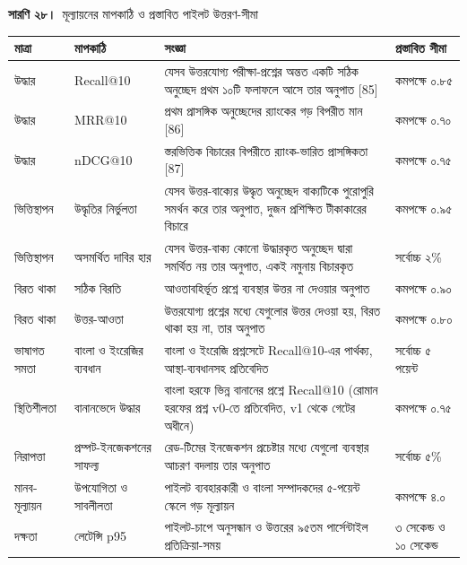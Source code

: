 \documentclass[border=10pt]{standalone}
\begin{document}
\begin{minipage}{17cm}
{\large\bfseries সারণি ২৮।}\ {\large মূল্যায়নের মাপকাঠি ও প্রস্তাবিত পাইলট উত্তরণ-সীমা}\par\vspace{7pt}
\small
{}
\begin{tabularx}{\linewidth}{@{}>{\hsize=0.698\hsize\raggedright\arraybackslash}X>{\hsize=1.070\hsize\raggedright\arraybackslash}X>{\hsize=1.488\hsize\raggedright\arraybackslash}X>{\hsize=0.744\hsize\raggedright\arraybackslash}X@{}}
\arrayrulecolor{bapilrule}\toprule
\rowcolor{white}\textbf{মাত্রা} & \textbf{মাপকাঠি} & \textbf{সংজ্ঞা} & \textbf{প্রস্তাবিত সীমা} \\
\midrule
উদ্ধার & Recall@10 & যেসব উত্তরযোগ্য পরীক্ষা-প্রশ্নের অন্তত একটি সঠিক অনুচ্ছেদ প্রথম ১০টি ফলাফলে আসে তার অনুপাত [85] & কমপক্ষে ০.৮৫ \\
উদ্ধার & MRR@10 & প্রথম প্রাসঙ্গিক অনুচ্ছেদের র‍্যাংকের গড় বিপরীত মান [86] & কমপক্ষে ০.৭০ \\
উদ্ধার & nDCG@10 & স্তরভিত্তিক বিচারের বিপরীতে র‍্যাংক-ভারিত প্রাসঙ্গিকতা [87] & কমপক্ষে ০.৭৫ \\
ভিত্তিস্থাপন & উদ্ধৃতির নির্ভুলতা & যেসব উত্তর-বাক্যের উদ্ধৃত অনুচ্ছেদ বাক্যটিকে পুরোপুরি সমর্থন করে তার অনুপাত, দুজন প্রশিক্ষিত টীকাকারের বিচারে & কমপক্ষে ০.৯৫ \\
ভিত্তিস্থাপন & অসমর্থিত দাবির হার & যেসব উত্তর-বাক্য কোনো উদ্ধারকৃত অনুচ্ছেদ দ্বারা সমর্থিত নয় তার অনুপাত, একই নমুনায় বিচারকৃত & সর্বোচ্চ ২\% \\
বিরত থাকা & সঠিক বিরতি & আওতাবহির্ভূত প্রশ্নে ব্যবস্থার উত্তর না দেওয়ার অনুপাত & কমপক্ষে ০.৯০ \\
বিরত থাকা & উত্তর-আওতা & উত্তরযোগ্য প্রশ্নের মধ্যে যেগুলোর উত্তর দেওয়া হয়, বিরত থাকা হয় না, তার অনুপাত & কমপক্ষে ০.৮০ \\
ভাষাগত সমতা & বাংলা ও ইংরেজির ব্যবধান & বাংলা ও ইংরেজি প্রশ্নসেটে Recall@10-এর পার্থক্য, আস্থা-ব্যবধানসহ প্রতিবেদিত & সর্বোচ্চ ৫ পয়েন্ট \\
স্থিতিশীলতা & বানানভেদে উদ্ধার & বাংলা হরফে ভিন্ন বানানের প্রশ্নে Recall@10 (রোমান হরফের প্রশ্ন v0-তে প্রতিবেদিত, v1 থেকে গেটের অধীনে) & কমপক্ষে ০.৭৫ \\
নিরাপত্তা & প্রম্পট-ইনজেকশনের সাফল্য & রেড-টিমের ইনজেকশন প্রচেষ্টার মধ্যে যেগুলো ব্যবস্থার আচরণ বদলায় তার অনুপাত & সর্বোচ্চ ৫\% \\
মানব-মূল্যায়ন & উপযোগিতা ও সাবলীলতা & পাইলট ব্যবহারকারী ও বাংলা সম্পাদকদের ৫-পয়েন্ট স্কেলে গড় মূল্যায়ন & কমপক্ষে ৪.০ \\
দক্ষতা & লেটেন্সি p95 & পাইলট-চাপে অনুসন্ধান ও উত্তরের ৯৫তম পার্সেন্টাইল প্রতিক্রিয়া-সময় & ৩ সেকেন্ড ও ১০ সেকেন্ড \\

\end{tabularx}
\end{minipage}
\end{document}
